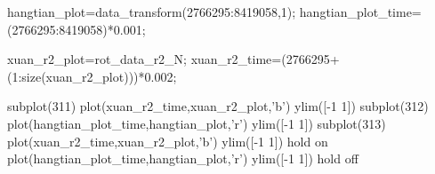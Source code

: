 hangtian_plot=data_transform(2766295:8419058,1);
hangtian_plot_time=(2766295:8419058)*0.001;

xuan_r2_plot=rot_data_r2_N;
xuan_r2_time=(2766295+(1:size(xuan_r2_plot)))*0.002;



subplot(311)
plot(xuan_r2_time,xuan_r2_plot,'b')
ylim([-1 1])
subplot(312)
plot(hangtian_plot_time,hangtian_plot,'r')
ylim([-1 1])
subplot(313)
plot(xuan_r2_time,xuan_r2_plot,'b')
ylim([-1 1])
hold on
plot(hangtian_plot_time,hangtian_plot,'r')
ylim([-1 1])
hold off